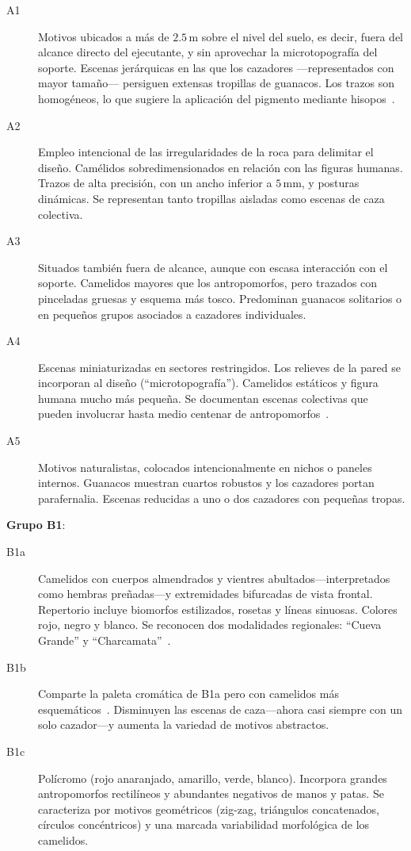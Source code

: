 \begin{description}
  \item[A1] Motivos ubicados a más de \(2.5\)\,m sobre el nivel del suelo, es decir, fuera del alcance directo del ejecutante, y sin aprovechar la microtopografía del soporte.
  Escenas jerárquicas en las que los cazadores —representados con mayor tamaño— persiguen extensas tropillas de guanacos.
  Los trazos son homogéneos, lo que sugiere la aplicación del pigmento mediante hisopos~\cite{aschero2012}.

  \item[A2] Empleo intencional de las irregularidades de la roca para delimitar el diseño.
  Camélidos sobredimensionados en relación con las figuras humanas.
  Trazos de alta precisión, con un ancho inferior a \(5\,\text{mm}\), y posturas dinámicas.
  Se representan tanto tropillas aisladas como escenas de caza colectiva.

  \item[A3]  Situados también fuera de alcance, aunque con escasa interacción con el soporte.
  Camelidos mayores que los antropomorfos, pero trazados con pinceladas gruesas y esquema más tosco.
  Predominan guanacos solitarios o en pequeños grupos asociados a cazadores individuales.

  \item[A4]  Escenas miniaturizadas en sectores restringidos.
  Los relieves de la pared se incorporan al diseño (“microtopografía”).
  Camelidos estáticos y figura humana mucho más pequeña.
  Se documentan escenas colectivas que pueden involucrar hasta medio centenar de antropomorfos~\cite{aschero2012}.

  \item[A5]  Motivos naturalistas, colocados intencionalmente en nichos o paneles internos.
  Guanacos muestran cuartos robustos y los cazadores portan parafernalia.
  Escenas reducidas a uno o dos cazadores con pequeñas tropas.
\end{description}

\medskip
\textbf{Grupo B1}:

\begin{description}
  \item[B1a]  Camelidos con cuerpos almendrados y vientres abultados—interpretados como hembras preñadas—y extremidades bifurcadas de vista frontal.
  Repertorio incluye biomorfos estilizados, rosetas y líneas sinuosas.
  Colores rojo, negro y blanco.
  Se reconocen dos modalidades regionales: “Cueva Grande” y “Charcamata”~\cite{aschero2018b,aschero2021}.

  \item[B1b]  Comparte la paleta cromática de B1a pero con camelidos más esquemáticos~\cite{aschero2023}.
  Disminuyen las escenas de caza—ahora casi siempre con un solo cazador—y aumenta la variedad de motivos abstractos.

  \item[B1c]  Polícromo (rojo anaranjado, amarillo, verde, blanco).
  Incorpora grandes antropomorfos rectilíneos y abundantes negativos de manos y patas.
  Se caracteriza por motivos geométricos (zig-zag, triángulos concatenados, círculos concéntricos) y una marcada variabilidad morfológica de los camelidos.
\end{description}

